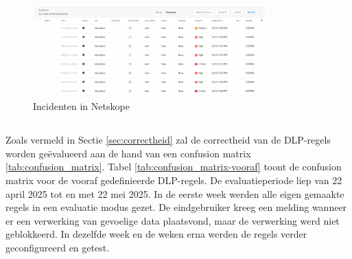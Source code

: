
\chapter{}%
\label{ch:resultaten}

\section{}
\label{sec:incidenten-resultaten}

\begin{figure}[h]
    \centering
    \includegraphics[width=0.8\textwidth]{img/netskope_incidents2.png}
    \caption{Incidenten in Netskope}
    \label{fig:netskope_incidenten}
\end{figure}

\section{}
\label{sec:res-vooraf-gedefinieerde-dlp-regels}


\subsection{}
\label{sec:functionaliteit-resultaten-vooraf}


\subsection{}
\label{sec:correctheid-resultaten-vooraf}

Zoals vermeld in Sectie \ref{sec:correctheid} zal de correctheid van de DLP-regels worden geëvalueerd aan de hand van een confusion matrix \ref{tab:confusion_matrix}. 
Tabel \ref{tab:confusion_matrix-vooraf} toont de confusion matrix voor de vooraf gedefinieerde DLP-regels. 
De evaluatieperiode liep van 22 april 2025 tot en met 22 mei 2025. 
In de eerste week werden alle eigen gemaakte regels in een evaluatie modus gezet. 
De eindgebruiker kreeg een melding wanneer er een verwerking van gevoelige data plaatsvond, maar de verwerking werd niet geblokkeerd. 
In dezelfde week en de weken erna werden de regels verder geconfigureerd en getest. 


